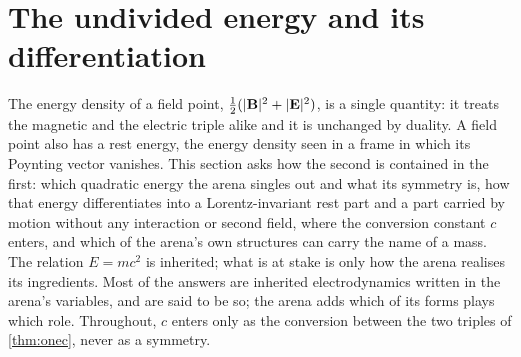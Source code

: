 \section{The undivided energy and its differentiation}
\label{sec:energy}

The energy density of a field point, $\tfrac12(|\mathbf B|^2+|\mathbf E|^2)$, is a single quantity: it treats the magnetic and the electric triple
alike and it is unchanged by duality. A field point also has a rest energy, the energy density seen in a frame in which its Poynting vector
vanishes. This section asks how the second is contained in the first: which quadratic energy the arena singles out and what its symmetry is,
how that energy differentiates into a Lorentz-invariant rest part and a part carried by motion without any interaction or second field, where
the conversion constant $c$ enters, and which of the arena's own structures can carry the name of a mass. The relation $E=mc^2$
\cite{Einstein1905} is inherited; what is at stake is only how the arena realises its ingredients. Most of the answers are inherited
electrodynamics written in the arena's variables, and are said to be so; the arena adds which of its forms plays which role. Throughout, $c$
enters only as the conversion between the two triples of \cref{thm:onec}, never as a symmetry.

